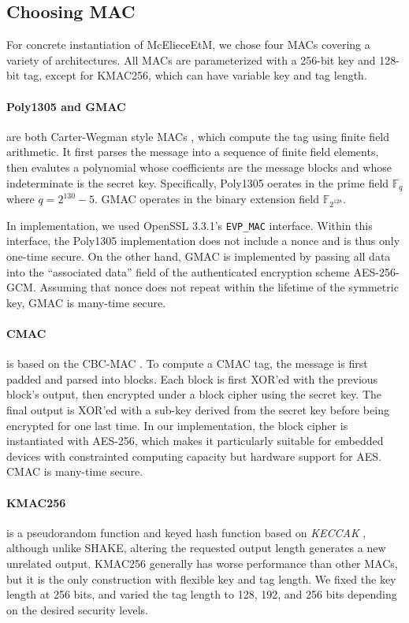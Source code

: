 \documentclass[runningheads]{llncs}
\begin{document}
\subsection{Choosing MAC}\label{sec:choosing-mac}
For concrete instantiation of McElieceEtM, we chose four MACs covering a variety of architectures. All MACs are parameterized with a 256-bit key and 128-bit tag, except for KMAC256, which can have variable key and tag length.

\paragraph{Poly1305 \cite{DBLP:conf/fse/Bernstein05} and GMAC \cite{NIST80038D}} are both Carter-Wegman style MACs \cite{DBLP:journals/jcss/CarterW79,DBLP:journals/jcss/WegmanC81}, which compute the tag using finite field arithmetic. It first parses the message into a sequence of finite field elements, then evalutes a polynomial whose coefficients are the message blocks and whose indeterminate is the secret key. Specifically, Poly1305 oerates in the prime field $\mathbb{F}_q$ where $q = 2^{130} - 5$. GMAC operates in the binary extension field $\mathbb{F}_{2^{128}}$.

In implementation, we used OpenSSL 3.3.1's \texttt{EVP\_MAC} interface. Within this interface, the Poly1305 implementation does not include a nonce and is thus only one-time secure. On the other hand, GMAC is implemented by passing all data into the ``associated data'' field of the authenticated encryption scheme AES-256-GCM. Assuming that nonce does not repeat within the lifetime of the symmetric key, GMAC is many-time secure.

\paragraph{CMAC \cite{NIST80038B}} is based on the CBC-MAC \cite{DBLP:conf/crypto/BlackR00}. To compute a CMAC tag, the message is first padded and parsed into blocks. Each block is first XOR'ed with the previous block's output, then encrypted under a block cipher using the secret key. The final output is XOR'ed with a sub-key derived from the secret key before being encrypted for one last time. In our implementation, the block cipher is instantiated with AES-256, which makes it particularly suitable for embedded devices with constrainted computing capacity but hardware support for AES. CMAC is many-time secure.

\paragraph{KMAC256 \cite{NIST800185}} is a pseudorandom function and keyed hash function based on \textit{KECCAK} \cite{NISTFIPS202}, although unlike SHAKE, altering the requested output length generates a new unrelated output. KMAC256 generally has worse performance than other MACs, but it is the only construction with flexible key and tag length. We fixed the key length at 256 bits, and varied the tag length to 128, 192, and 256 bits depending on the desired security levels.
\end{document}
